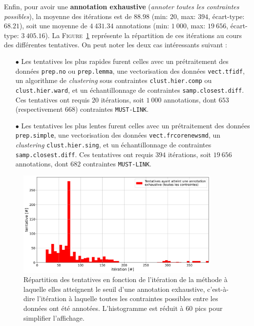 			Enfin, pour avoir une \textbf{annotation exhaustive} (\textit{annoter toutes les contraintes possibles}), la moyenne des itérations est de $88.98$ (min: $20$, max: $394$, écart-type: $68.21$), soit une moyenne de $4~431.34$ annotations (min: $1~000$, max: $19~656$, écart-type: $3~405.16$).
			La \textsc{Figure~\ref{figure:4.2.1-ETUDE-OPTIMISATION-HISTOGRAMME-ANNOTATION-EXHAUSTIVE}} représente la répartition de ces itérations au cours des différentes tentatives.
			On peut noter les deux cas intéressants suivant :
			\begin{itemize}
				\item[$\bullet$] Les tentatives les plus rapides furent celles avec un prétraitement des données \texttt{prep.no} ou \texttt{prep.lemma}, une vectorisation des données \texttt{vect.tfidf}, un algorithme de \textit{clustering} sous contraintes \texttt{clust.hier.comp} ou \texttt{clust.hier.ward}, et un échantillonnage de contraintes \texttt{samp.closest.diff}. Ces tentatives ont requis $20$ itérations, soit $1~000$ annotations, dont $653$ (respectivement $668$) contraintes \texttt{MUST-LINK}.
				\item[$\bullet$] Les tentatives les plus lentes furent celles avec un prétraitement des données \texttt{prep.simple}, une vectorisation des données \texttt{vect.frcorenewsmd}, un \textit{clustering} \texttt{clust.hier.sing}, et un échantillonnage de contraintes \texttt{samp.closest.diff}. Ces tentatives ont requis $394$ itérations, soit $19~656$ annotations, dont $682$ contraintes \texttt{MUST-LINK}.
			\end{itemize}
			\begin{figure}[!htb]
				\centering
				\includegraphics[width=0.90\textwidth]{figures/etude-efficience-histogramme-annotation-exhaustive}
				\caption{
					Répartition des tentatives en fonction de l'itération de la méthode à laquelle elles atteignent le seuil d'une annotation exhaustive, c'est-à-dire l'itération à laquelle toutes les contraintes possibles entre les données ont été annotées.
					L'histogramme est réduit à $60$ pics pour simplifier l'affichage.
				}
				\label{figure:4.2.1-ETUDE-OPTIMISATION-HISTOGRAMME-ANNOTATION-EXHAUSTIVE}
			\end{figure}
